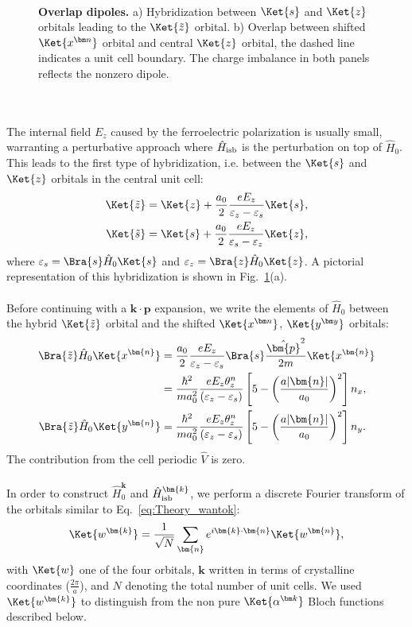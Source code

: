 \begin{figure}[t]
~\centering
{}\caption{\label{fig:Rashba_overlapdip} {\bf Overlap dipoles.} a) Hybridization between $\Ket{s}$ and $\Ket{z}$ orbitals leading to the $\Ket{\tilde z}$ orbital. b) Overlap between shifted $\Ket{x^{\bm n}}$ orbital and central $\Ket{z}$ orbital, the dashed line indicates a unit cell boundary. The charge imbalance in both panels reflects the nonzero dipole.}
\end{figure}
\\\\
The internal field $E_z$ caused by the ferroelectric polarization is usually small, warranting a perturbative approach where $\hat{H}_{\rm isb}$ is the perturbation on top of $\hat{H}_0$.
This leads to the first type of hybridization, i.e. between the $\Ket{s}$ and $\Ket{z}$ orbitals in the central unit cell:
\begin{align}
	\Ket{\tilde{z}} &= \Ket{z} + \frac{a_0}{2}\frac{e E_z}{\varepsilon_z - \varepsilon_s}\Ket{s},\\
	\Ket{\tilde{s}}   &= \Ket{s} +\frac{a_0}{2}\frac{e E_z}{\varepsilon_s - \varepsilon_z}\Ket{z},
\end{align}
where $\varepsilon_s = \Bra{s} \hat{H}_0 \Ket{s}$ and $\varepsilon_z = \Bra{z} \hat{H}_0 \Ket{z}$. A pictorial representation of this hybridization is shown in Fig.~\ref{fig:Rashba_overlapdip}(a).
\\\\
Before continuing with a $\bm k \cdot \bm p$ expansion, we write the elements of $\hat{H}_0$ between the hybrid $\Ket{\tilde{z}}$ orbital and the shifted $\Ket{x^{\bm n}}$, $\Ket{y^{\bm y}}$ orbitals:
\begin{align}
	\Bra{\tilde{z}} \hat{H}_0 \Ket{x^{\bm{n}}} &=\frac{a_0}{2} \frac{e E_z}{\varepsilon_z - \varepsilon_s}\Bra{s} \frac{\hat{\bm{p}}^2}{2m} \Ket{x^{\bm{n}}}\label{eq:Rashba_momentum_dip}\\
	&= \frac{\hbar^2}{m a_0^2}\frac{e E_z \theta_z^n}{(\varepsilon_z - \varepsilon_s)} \left[5 - \left(\frac{a |\bm{n}|}{a_0}\right)^2\right]n_x,\label{eq:Rashba_momentum_dip1}\\
	\Bra{\tilde{z}} \hat{H}_0 \Ket{y^{\bm{n}}} &=\frac{\hbar^2}{m a_0^2} \frac{e E_z\theta_z^n}{(\varepsilon_z - \varepsilon_s)}\left[5 - \left(\frac{a |\bm{n}|}{a_0}\right)^2\right]n_y\label{eq:Rashba_momentum_dip2}.
\end{align}
The contribution from the cell periodic $\hat{V}$ is zero.
\\\\
In order to construct $\hat{H}_0^{\bm{k}}$ and $\hat{H}_{\rm isb}^{\bm{k}}$, we perform a discrete Fourier transform of the orbitals similar to Eq.~\eqref{eq:Theory_wantok}:
\begin{equation}
	\label{eq:Rashba_wantok}
	\Ket{w^{\bm{k}}} = \frac{1}{\sqrt{N}}\sum_{\bm{n}} e^{i \bm{k}\cdot \bm{n}}\Ket{w^{\bm{n}}},
\end{equation}
with $\Ket{w}$ one of the four orbitals, $\bm{k}$ written in terms of crystalline coordinates ($\frac{2\pi}{a}$), and $N$ denoting the total number of unit cells. We used $\Ket{w^{\bm{k}}}$ to distinguish from the non pure $\Ket{\alpha^{\bm k}}$ Bloch functions described below.

